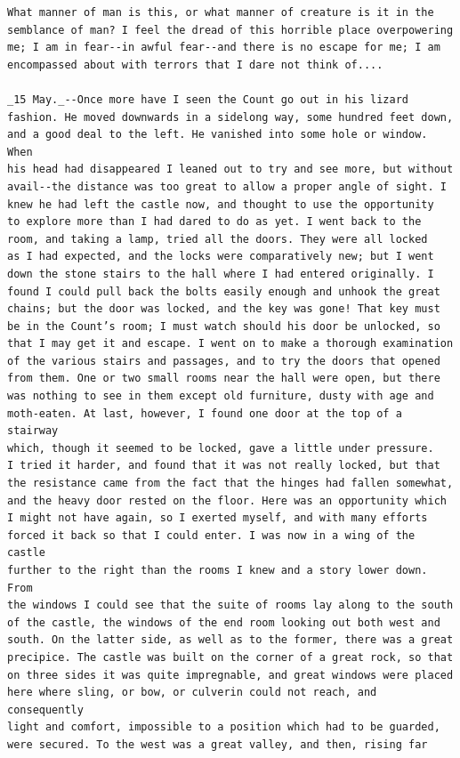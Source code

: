 \documentclass{article}
\begin{document}
\begin{verbatim}
What manner of man is this, or what manner of creature is it in the
semblance of man? I feel the dread of this horrible place overpowering
me; I am in fear--in awful fear--and there is no escape for me; I am
encompassed about with terrors that I dare not think of....

_15 May._--Once more have I seen the Count go out in his lizard
fashion. He moved downwards in a sidelong way, some hundred feet down,
and a good deal to the left. He vanished into some hole or window. When
his head had disappeared I leaned out to try and see more, but without
avail--the distance was too great to allow a proper angle of sight. I
knew he had left the castle now, and thought to use the opportunity
to explore more than I had dared to do as yet. I went back to the
room, and taking a lamp, tried all the doors. They were all locked
as I had expected, and the locks were comparatively new; but I went
down the stone stairs to the hall where I had entered originally. I
found I could pull back the bolts easily enough and unhook the great
chains; but the door was locked, and the key was gone! That key must
be in the Count’s room; I must watch should his door be unlocked, so
that I may get it and escape. I went on to make a thorough examination
of the various stairs and passages, and to try the doors that opened
from them. One or two small rooms near the hall were open, but there
was nothing to see in them except old furniture, dusty with age and
moth-eaten. At last, however, I found one door at the top of a stairway
which, though it seemed to be locked, gave a little under pressure.
I tried it harder, and found that it was not really locked, but that
the resistance came from the fact that the hinges had fallen somewhat,
and the heavy door rested on the floor. Here was an opportunity which
I might not have again, so I exerted myself, and with many efforts
forced it back so that I could enter. I was now in a wing of the castle
further to the right than the rooms I knew and a story lower down. From
the windows I could see that the suite of rooms lay along to the south
of the castle, the windows of the end room looking out both west and
south. On the latter side, as well as to the former, there was a great
precipice. The castle was built on the corner of a great rock, so that
on three sides it was quite impregnable, and great windows were placed
here where sling, or bow, or culverin could not reach, and consequently
light and comfort, impossible to a position which had to be guarded,
were secured. To the west was a great valley, and then, rising far

\end{verbatim}
\end{document}
